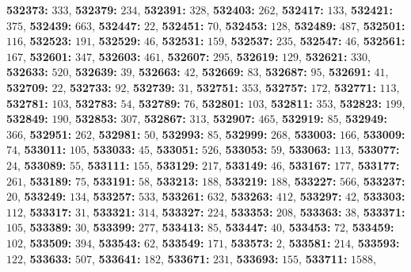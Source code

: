 \textsf{\bfseries 532373:} $333$, \textsf{\bfseries 532379:} $234$, \textsf{\bfseries 532391:} $328$, \textsf{\bfseries 532403:} $262$, \textsf{\bfseries 532417:} $133$, \textsf{\bfseries 532421:} $375$, \textsf{\bfseries 532439:} $663$, \textsf{\bfseries 532447:} $22$, \textsf{\bfseries 532451:} $70$, \textsf{\bfseries 532453:} $128$, \textsf{\bfseries 532489:} $487$, \textsf{\bfseries 532501:} $116$, \textsf{\bfseries 532523:} $191$, \textsf{\bfseries 532529:} $46$, \textsf{\bfseries 532531:} $159$, \textsf{\bfseries 532537:} $235$, \textsf{\bfseries 532547:} $46$, \textsf{\bfseries 532561:} $167$, \textsf{\bfseries 532601:} $347$, \textsf{\bfseries 532603:} $461$, \textsf{\bfseries 532607:} $295$, \textsf{\bfseries 532619:} $129$, \textsf{\bfseries 532621:} $330$, \textsf{\bfseries 532633:} $520$, \textsf{\bfseries 532639:} $39$, \textsf{\bfseries 532663:} $42$, \textsf{\bfseries 532669:} $83$, \textsf{\bfseries 532687:} $95$, \textsf{\bfseries 532691:} $41$, \textsf{\bfseries 532709:} $22$, \textsf{\bfseries 532733:} $92$, \textsf{\bfseries 532739:} $31$, \textsf{\bfseries 532751:} $353$, \textsf{\bfseries 532757:} $172$, \textsf{\bfseries 532771:} $113$, \textsf{\bfseries 532781:} $103$, \textsf{\bfseries 532783:} $54$, \textsf{\bfseries 532789:} $76$, \textsf{\bfseries 532801:} $103$, \textsf{\bfseries 532811:} $353$, \textsf{\bfseries 532823:} $199$, \textsf{\bfseries 532849:} $190$, \textsf{\bfseries 532853:} $307$, \textsf{\bfseries 532867:} $313$, \textsf{\bfseries 532907:} $465$, \textsf{\bfseries 532919:} $85$, \textsf{\bfseries 532949:} $366$, \textsf{\bfseries 532951:} $262$, \textsf{\bfseries 532981:} $50$, \textsf{\bfseries 532993:} $85$, \textsf{\bfseries 532999:} $268$, \textsf{\bfseries 533003:} $166$, \textsf{\bfseries 533009:} $74$, \textsf{\bfseries 533011:} $105$, \textsf{\bfseries 533033:} $45$, \textsf{\bfseries 533051:} $526$, \textsf{\bfseries 533053:} $59$, \textsf{\bfseries 533063:} $113$, \textsf{\bfseries 533077:} $24$, \textsf{\bfseries 533089:} $55$, \textsf{\bfseries 533111:} $155$, \textsf{\bfseries 533129:} $217$, \textsf{\bfseries 533149:} $46$, \textsf{\bfseries 533167:} $177$, \textsf{\bfseries 533177:} $261$, \textsf{\bfseries 533189:} $75$, \textsf{\bfseries 533191:} $58$, \textsf{\bfseries 533213:} $188$, \textsf{\bfseries 533219:} $188$, \textsf{\bfseries 533227:} $566$, \textsf{\bfseries 533237:} $20$, \textsf{\bfseries 533249:} $134$, \textsf{\bfseries 533257:} $533$, \textsf{\bfseries 533261:} $632$, \textsf{\bfseries 533263:} $412$, \textsf{\bfseries 533297:} $42$, \textsf{\bfseries 533303:} $112$, \textsf{\bfseries 533317:} $31$, \textsf{\bfseries 533321:} $314$, \textsf{\bfseries 533327:} $224$, \textsf{\bfseries 533353:} $208$, \textsf{\bfseries 533363:} $38$, \textsf{\bfseries 533371:} $105$, \textsf{\bfseries 533389:} $30$, \textsf{\bfseries 533399:} $277$, \textsf{\bfseries 533413:} $85$, \textsf{\bfseries 533447:} $40$, \textsf{\bfseries 533453:} $72$, \textsf{\bfseries 533459:} $102$, \textsf{\bfseries 533509:} $394$, \textsf{\bfseries 533543:} $62$, \textsf{\bfseries 533549:} $171$, \textsf{\bfseries 533573:} $2$, \textsf{\bfseries 533581:} $214$, \textsf{\bfseries 533593:} $122$, \textsf{\bfseries 533633:} $507$, \textsf{\bfseries 533641:} $182$, \textsf{\bfseries 533671:} $231$, \textsf{\bfseries 533693:} $155$, \textsf{\bfseries 533711:} $1588$, 
